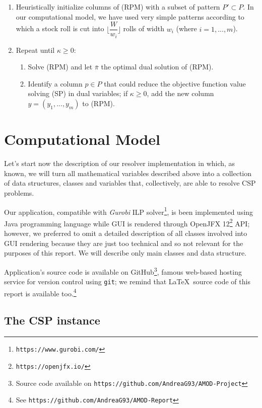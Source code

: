 \documentclass[10pt,a4paper]{article}
\begin{document}
\begin{enumerate}
\item Heuristically initialize columns of (RPM) with a subset of pattern $P' \subset P$. In our computational model, we have used very simple patterns according to which a stock roll is cut into $\lfloor \dfrac{W}{w_i}\rfloor$ rolls of width $w_i$ (where $i = 1,...,m$). 

\item Repeat until $\kappa \geq 0$:

\begin{enumerate}
\item Solve (RPM) and let $\bar{\pi}$  the optimal dual solution of (RPM).
\item Identify a column $p \in P$ that could reduce the objective function value solving (SP) in dual variables; if $\kappa \geq 0$, add the new column $y = (y_1,...,y_m)$ to (RPM). 
\end{enumerate}

\end{enumerate}

\clearpage
\newpage
\section{Computational Model}

Let's start now the description of our resolver implementation in which, as known, we will turn all mathematical variables described above into a collection of data structures, classes and variables that, collectively, are able to resolve CSP problems.

Our application, compatible with \textit{Gurobi} ILP solver\footnote{\texttt{https://www.gurobi.com/}}, is been implemented using Java programming language while GUI is rendered through OpenJFX 12\footnote{\texttt{https://openjfx.io/}} API; however, we preferred to omit a detailed description of all classes involved into GUI rendering because they are just too technical and so not relevant for the purposes of this report. We will describe only main classes and data structure. 

Application's source code is available on GitHub\footnote{Source code available on \texttt{https://github.com/AndreaG93/AMOD-Project}}, famous web-based hosting service for version control using \texttt{git}; we remind that \LaTeX\ source code of this report is available too.\footnote{See \texttt{https://github.com/AndreaG93/AMOD-Report}}

\subsection{The CSP instance}
\end{document}
